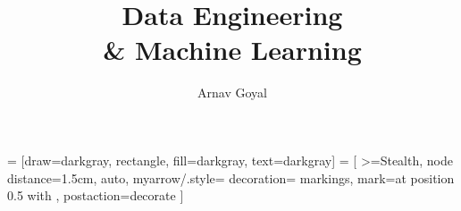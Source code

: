 \lstset{language=C}

\title{Data Engineering \\ \& Machine Learning}
\author{Arnav Goyal}

 = [draw=darkgray, rectangle, fill=darkgray, text=darkgray]
 = [
>=Stealth,
node distance=1.5cm,
auto,
myarrow/.style={
	decoration={
		markings,
		mark=at position 0.5 with {}
	},
	postaction={decorate}
}
]
\usetikzlibrary{positioning, arrows.meta, decorations.markings, decorations.pathreplacing}

\def\myreferences{
	\item Provided Course Material \& Lecture Notes
	\item Neural Networks and Learning Machines - 3e - S. Haykin
}


	\frontmatter
	\maketitle
	\preface
	
	\mainmatter

	
	
